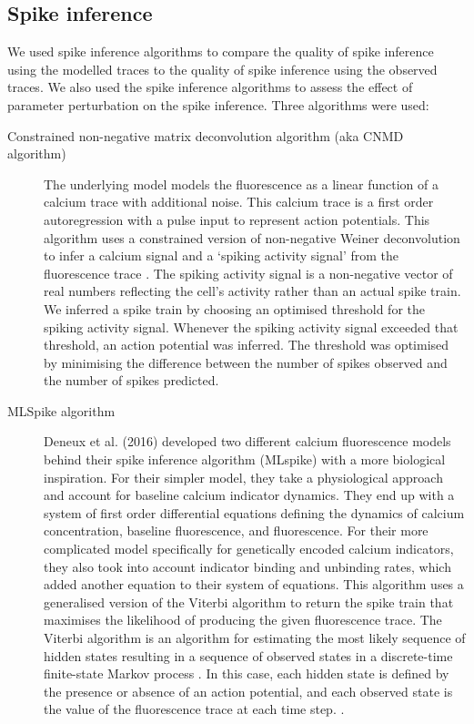\subsection{Spike inference}
We used spike inference algorithms to compare the quality of spike inference using the modelled traces to the quality of spike inference using the observed traces. We also used the spike inference algorithms to assess the effect of parameter perturbation on the spike inference. Three algorithms were used:
\begin{description}
    \item[Constrained non-negative matrix deconvolution algorithm (aka CNMD algorithm)] The underlying model models the fluorescence as a linear function of a calcium trace with additional noise. This calcium trace is a first order autoregression with a pulse input to represent action potentials. This algorithm uses a constrained version of non-negative Weiner deconvolution to infer a calcium signal and a `spiking activity signal' from the fluorescence trace \parencite{vogelstein, pnevmatikakis}. The spiking activity signal is a non-negative vector of real numbers reflecting the cell's activity rather than an actual spike train. We inferred a spike train by choosing an optimised threshold for the spiking activity signal. Whenever the spiking activity signal exceeded that threshold, an action potential was inferred. The threshold was optimised by minimising the difference between the number of spikes observed and the number of spikes predicted.
    \item[MLSpike algorithm] Deneux et al. (2016) developed two different calcium fluorescence models behind their spike inference algorithm (MLspike) with a more biological inspiration. For their simpler model, they take a physiological approach and account for baseline calcium indicator dynamics. They end up with a system of first order differential equations defining the dynamics of calcium concentration, baseline fluorescence, and fluorescence. For their more complicated model specifically for genetically encoded calcium indicators, they also took into account indicator binding and unbinding rates, which added another equation to their system of equations. This algorithm uses a generalised version of the Viterbi algorithm to return the spike train that maximises the likelihood of producing the given fluorescence trace. The Viterbi algorithm is an algorithm for estimating the most likely sequence of hidden states resulting in a sequence of observed states in a discrete-time finite-state Markov process  \parencite{forney}. In this case, each hidden state is defined by the presence or absence of an action potential, and each observed state is the value of the fluorescence trace at each time step. \parencite{deneux}.

\end{description}
